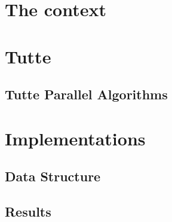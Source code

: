 \documentclass[12pt]{report}
\begin{document}


% 


\begin{abstract}
  
\end{abstract}

\tableofcontents






\chapter{The context}




\chapter{Tutte}





\section{Tutte Parallel Algorithms}


\chapter{Implementations}



\section{Data Structure}


\section{Results}





\end{document}
